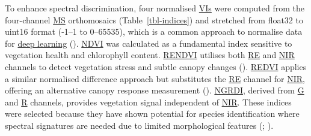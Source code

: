 \documentclass[
]{scrreprt}
\begin{document}
To enhance spectral discrimination, four normalised
\hyperref[acronyms_VI]{VIs} were computed from the four-channel
\hyperref[acronyms_MS]{MS} orthomosaics (Table~\ref{tbl-indices}) and
stretched from float32 to uint16 format (-1--1 to 0--65535), which is a
common approach to normalise data for \hyperref[acronyms_DL]{deep
learning} ().
\hyperref[acronyms_NDVI]{NDVI} was calculated as a fundamental index
sensitive to vegetation health and chlorophyll content.
\hyperref[acronyms_RENDVI]{RENDVI} utilises both
\hyperref[acronyms_RE]{RE} and \hyperref[acronyms_NIR]{NIR} channels to
detect vegetation stress and subtle canopy changes
().
\hyperref[acronyms_REDVI]{REDVI} applies a similar normalised difference
approach but substitutes the \hyperref[acronyms_RE]{RE} channel for
\hyperref[acronyms_NIR]{NIR}, offering an alternative canopy response
measurement (). \hyperref[acronyms_NGRDI]{NGRDI}, derived from
\hyperref[acronyms_G]{G} and \hyperref[acronyms_R]{R} channels, provides
vegetation signal independent of \hyperref[acronyms_NIR]{NIR}. These
indices were selected because they have shown potential for species
identification where spectral signatures are needed due to limited
morphological features
(;
).
\end{document}
